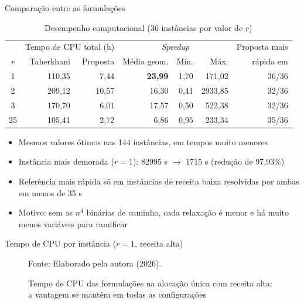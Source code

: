 \documentclass[aspectratio=169, 10pt]{beamer}
\newcommand{\fonte}[1]{{\scriptsize Fonte: #1\par}}
\begin{document}
\begin{frame}{Comparação entre as formulações}
  \begin{table}
    \centering
    \footnotesize
    \caption{Desempenho computacional (36 instâncias por valor de $r$)}
    \begin{tabular}{crrrrrr}
      \toprule
       & \multicolumn{2}{c}{Tempo de CPU total (h)} & \multicolumn{3}{c}{\textit{Speedup}} & Proposta mais\\
      $r$ & Taherkhani & Proposta & Média geom. & Mín. & Máx. & rápida em\\
      \midrule
      1 & 110,35 & 7,44 & \textbf{23,99} & 1,70 & 171,02 & 36/36 \\
      2 & 209,12 & 10,57 & 16,30 & 0,41 & 2933,85 & 32/36 \\
      3 & 170,70 & 6,01 & 17,57 & 0,50 & 522,38 & 32/36 \\
      25 & 105,41 & 2,72 & 6,86 & 0,95 & 233,34 & 35/36 \\
      \bottomrule
    \end{tabular}
  \end{table}

  \small
  \begin{itemize}
    \item Mesmos valores ótimos nas 144 instâncias, em tempos muito menores
    \item Instância mais demorada ($r=1$): \alert{82995 s $\to$ 1715 s} (redução de 97,93\%)
    \item Referência mais rápida só em instâncias de receita baixa resolvidas por ambas em menos de 35 s
    \item Motivo: sem as $n^4$ binárias de caminho, cada relaxação é menor e há muito menos variáveis para ramificar
  \end{itemize}
\end{frame}

\begin{frame}{Tempo de CPU por instância ($r=1$, receita alta)}
  \begin{figure}
    \centering
    \caption{Tempo de CPU das formulações na alocação única com receita alta: a vantagem se mantém em todas as configurações}

    \fonte{Elaborado pela autora (2026).}
  \end{figure}
\end{frame}
\end{document}
